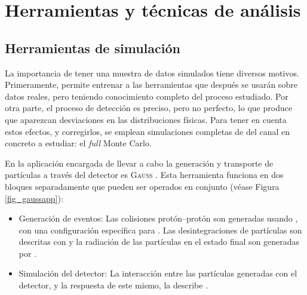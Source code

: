 \chapter{Herramientas y técnicas de análisis}
\label{cha:tools}

\section{Herramientas de simulación}

La importancia de tener una muestra de datos simulados tiene diversos motivos. Primeramente, permite entrenar a las herramientas que después se usarán sobre datos reales, pero teniendo conocimiento completo del proceso estudiado. Por otra parte, el proceso de detección es preciso, pero no perfecto, lo que produce que aparezcan desviaciones en las distribuciones físicas. Para tener en cuenta estos efectos, y corregirlos, se emplean simulaciones completas de \lhcb del canal en concreto a estudiar: el \emph{full} Monte Carlo.

En \lhcb la aplicación \color{dieg} encargada \color{norm} de llevar a cabo la generación y transporte de partículas a través del detector es \textsc{Gauss} \cite{Clemencic_2011}. Esta herramienta funciona en dos bloques separadamente que pueden ser operados en conjunto (véase Figura \ref{fig_gaussapp}):
\begin{itemize}
	\item Generación de eventos: Las colisiones protón--protón son generadas usando \pythia \cite{sjostrand2015introduction}, con una configuración específica para \lhcb. Las desintegraciones de partículas son descritas con \eviltgen \cite{Lange:2001uf} y la radiación de las partículas en el estado final son generadas por \photos \cite{golonka2006photos}.
	\item Simulación del detector: La interacción entre las partículas generadas con el detector, y la respuesta de este mismo, la describe \geant \cite{Agostinelli:2002hh}.
\end{itemize}


